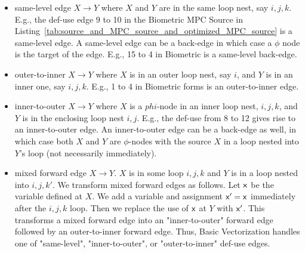\begin{itemize}
\item same-level edge $X\rightarrow Y$ where $X$ and $Y$ are in the same loop nest, say $i,j,k$. E.g., the def-use edge 9 to 10 in the Biometric MPC Source in Listing~\ref{tab:source_and_MPC_source_and_optimized_MPC_source} is a same-level edge. A same-level edge can be a back-edge in which case a $\phi$ node is the target of the edge.
E.g., 15 to 4 in Biometric is a same-level back-edge.
\item outer-to-inner $X\rightarrow Y$ where $X$ is in an outer loop nest, say $i$, and $Y$ is in an inner one, say $i,j,k$. E.g., 1 to 4 in Biometric forms is an outer-to-inner edge.
\item inner-to-outer $X\rightarrow Y$ where $X$ is a $phi$-node in an inner loop nest, $i,j,k$, and $Y$ is in the enclosing loop nest $i,j$. E.g., the def-use from 8 to 12 gives rise to an inner-to-outer edge.
An inner-to-outer edge can be a back-edge as well, in which case both $X$ and $Y$ are $\phi$-nodes with the source $X$ in a loop nested into $Y$'s loop (not necessarily immediately).


\item mixed forward edge $X\rightarrow Y$. $X$ is in some loop $i,j,k$ and $Y$ is in a loop nested into $i,j,k'$. We transform mixed forward edges as follows. Let ${\sf {x}}$ be the variable defined at $X$. We add a variable and assignment ${\sf {x}}' = {\sf {x}}$ immediately after the $i,j,k$ loop. Then we replace the use of ${\sf {x}}$ at $Y$ with ${\sf {x}}'$. This transforms a mixed forward edge into an "inner-to-outer" forward edge followed by an outer-to-inner forward edge. Thus, Basic Vectorization handles one of "same-level", "inner-to-outer", or "outer-to-inner" def-use edges.
 \end{itemize}

